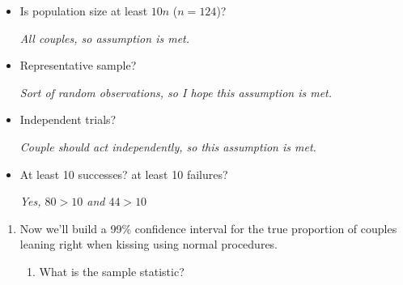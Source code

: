 \begin{enumerate}
     \begin{itemize}
        \item Is population size at least $10n$ ($n = 124$)? 
\begin{students}
        \vspace{.7cm}        
\end{students}

\begin{key}
  {\it  All couples, so assumption is met.}
\end{key}
        \item Representative sample?   
\begin{students}
        \vspace{1cm}        
\end{students}

\begin{key}
  {\it  Sort of random observations, so I hope this   assumption is met.}
\end{key}
        \item Independent trials?   
\begin{students}
        \vspace{1cm}        
\end{students}

\begin{key}
  {\it  Couple should act independently, so this assumption is met.}
\end{key}
        \item At least 10 successes? at least 10 failures?   
\begin{students}
        \vspace{1cm}        
\end{students}

\begin{key}
  {\it  Yes, $80>10$ and $44 > 10$}
\end{key}
     \end{itemize}
     \begin{enumerate}
     \item Now we'll build a 99\% confidence interval for the true
       proportion of couples leaning right when kissing using normal
       procedures. 
       \begin{enumerate}
       \item What is the sample statistic?  
\begin{students}
        \vspace{1cm}        
\end{students}


\end{enumerate}
\end{enumerate}
\end{enumerate}

